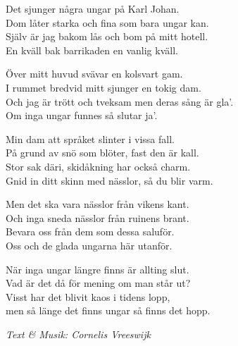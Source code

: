 \vspace{10pt}
Det sjunger några ungar på Karl Johan.\\
Dom låter starka och fina som bara ungar kan.\\
Själv är jag bakom lås och bom på mitt hotell.\\
En kväll bak barrikaden en vanlig kväll.\par
\vspace{10pt}
Över mitt huvud svävar en kolsvart gam.\\
I rummet bredvid mitt sjunger en tokig dam.\\
Och jag är trött och tveksam men deras sång är gla'.\\
Om inga ungar funnes så slutar ja'.\par
\vspace{10pt}
Min dam att språket slinter i vissa fall.\\
På grund av snö som blöter, fast den är kall.\\
Stor sak däri, skidåkning har också charm.\\
Gnid in ditt skinn med nässlor, så du blir varm.\par
\vspace{10pt}
Men det ska vara nässlor från vikens kant.\\
Och inga sneda nässlor från ruinens brant.\\
Bevara oss från dem som dessa saluför.\\
Oss och de glada ungarna här utanför.\par
\vspace{10pt}
När inga ungar längre finns är allting slut.\\
Vad är det då för mening om man står ut?\\
Visst har det blivit kaos i tidens lopp,\\
men så länge det finns ungar så finns det hopp.\par
\vspace{10pt}
{\footnotesize\textit{Text \& Musik: Cornelis Vreeswijk}}
